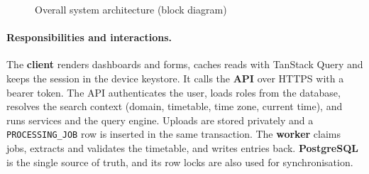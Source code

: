 \begin{figure}[H]
\caption{Overall system architecture (block diagram)}
\label{fig:arch}
\end{figure}

\paragraph{Responsibilities and interactions.}
The \textbf{client} renders dashboards and forms, caches reads with TanStack Query and keeps the
session in the device keystore. It calls the \textbf{API} over HTTPS with a bearer token. The API
authenticates the user, loads roles from the database, resolves the search context (domain,
timetable, time zone, current time), and runs services and the query engine. Uploads are stored
privately and a \texttt{PROCESSING\_JOB} row is inserted in the same transaction. The \textbf{worker}
claims jobs, extracts and validates the timetable, and writes entries back. \textbf{PostgreSQL} is
the single source of truth, and its row locks are also used for synchronisation.

